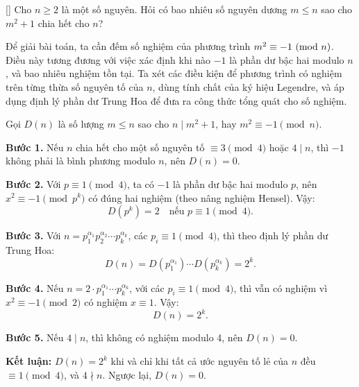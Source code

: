\documentclass[../08-quadratic-residues.tex]{subfiles}
\begin{document}
\begin{example*}\label{example:MEMO-2015-T-P4}[\textbf{}]
    Cho \( n \ge 2 \) là một số nguyên. Hỏi có bao nhiêu số nguyên dương \( m \le n \) sao cho \( m^2 + 1 \) chia hết cho \( n \)?    
\end{example*}

\begin{story*}
    Để giải bài toán, ta cần đếm số nghiệm của phương trình \( m^2 \equiv -1 \ (\mathrm{mod}\ n) \). Điều này tương đương với việc xác định khi nào \( -1 \) là phần dư bậc hai modulo \( n \), và bao nhiêu nghiệm tồn tại. Ta xét các điều kiện để phương trình có nghiệm trên từng thừa số nguyên tố của \( n \), dùng tính chất của ký hiệu Legendre, và áp dụng định lý phần dư Trung Hoa để đưa ra công thức tổng quát cho số nghiệm.
\end{story*}

\begin{soln}\footnotemark
    Gọi \( D(n) \) là số lượng \( m \le n \) sao cho \( n \mid m^2 + 1 \), hay \( m^2 \equiv -1 \pmod{n} \).  

    \textbf{Bước 1.} Nếu \( n \) chia hết cho một số nguyên tố \( \equiv 3 \pmod{4} \) hoặc \( 4 \mid n \), thì \( -1 \) không phải là bình phương modulo \( n \), nên \( D(n) = 0 \).  

    \textbf{Bước 2.} Với \( p \equiv 1 \pmod{4} \), ta có \( -1 \) là phần dư bậc hai modulo \( p \), nên \( x^2 \equiv -1 \pmod{p^k} \) có đúng hai nghiệm (theo nâng nghiệm Hensel). Vậy:
    \[
        D(p^k) = 2 \quad \text{nếu } p \equiv 1 \pmod{4}.
    \]

    \textbf{Bước 3.} Với \( n = p_1^{\alpha_1} p_2^{\alpha_2} \cdots p_k^{\alpha_k} \), các \( p_i \equiv 1 \pmod{4} \), thì theo định lý phần dư Trung Hoa:
    \[
        D(n) = D(p_1^{\alpha_1}) \cdots D(p_k^{\alpha_k}) = 2^k.
    \]

    \textbf{Bước 4.} Nếu \( n = 2 \cdot p_1^{\alpha_1} \cdots p_k^{\alpha_k} \), với các \( p_i \equiv 1 \pmod{4} \), thì vẫn có nghiệm vì \( x^2 \equiv -1 \pmod{2} \) có nghiệm \( x \equiv 1 \). Vậy:
    \[
        D(n) = 2^k.
    \]

    \textbf{Bước 5.} Nếu \( 4 \mid n \), thì không có nghiệm modulo 4, nên \( D(n) = 0 \).

    \textbf{Kết luận:} \( D(n) = 2^k \) khi và chỉ khi tất cả ước nguyên tố lẻ của \( n \) đều \( \equiv 1 \pmod{4} \), và \( 4 \nmid n \).  
    Ngược lại, \( D(n) = 0 \).
\end{soln}

\end{document}

